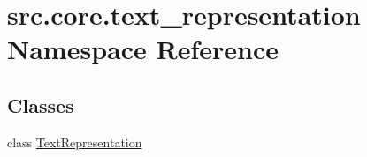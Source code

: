 \hypertarget{namespacesrc_1_1core_1_1text__representation}{\section{src.\+core.\+text\+\_\+representation Namespace Reference}
\label{namespacesrc_1_1core_1_1text__representation}
}
\subsection*{Classes}
\begin{DoxyCompactItemize}
\item 
class \hyperlink{classsrc_1_1core_1_1text__representation_1_1_text_representation}{Text\+Representation}
\end{DoxyCompactItemize}
